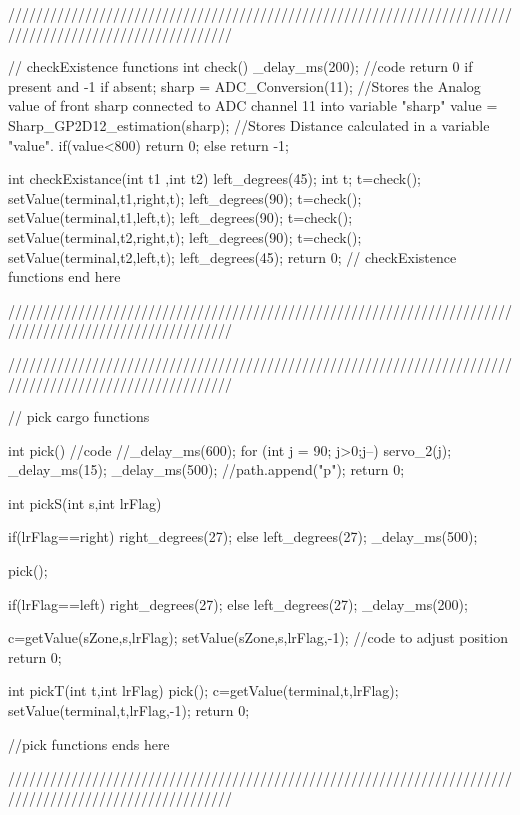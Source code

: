 ////////////////////////////////////////////////////////////////////////////////////////////////////////

// checkExistence functions
int check()
{
    _delay_ms(200);
	//code return 0 if present and -1 if absent;
	sharp = ADC_Conversion(11);						//Stores the Analog value of front sharp connected to ADC channel 11 into variable "sharp"
	value = Sharp_GP2D12_estimation(sharp);            //Stores Distance calculated in a variable "value".
	if(value<800)
		return 0;
	else
		return -1;
}

int checkExistance(int t1 ,int t2)
{
	left_degrees(45);
	int t;
	t=check();
    setValue(terminal,t1,right,t);
    left_degrees(90);
    t=check();
    setValue(terminal,t1,left,t);
    left_degrees(90);
    t=check();
    setValue(terminal,t2,right,t);
    left_degrees(90);
    t=check();
    setValue(terminal,t2,left,t);
    left_degrees(45);
	return 0;
}
// checkExistence functions end here


////////////////////////////////////////////////////////////////////////////////////////////////////////







////////////////////////////////////////////////////////////////////////////////////////////////////////

// pick cargo functions


int pick()
{
    //code
	//_delay_ms(600);
	for (int j = 90; j>0;j--)
	{ servo_2(j);
		_delay_ms(15);
	}
	_delay_ms(500);
	//path.append("p");
    return 0;
}

int pickS(int s,int lrFlag)
{
    if(lrFlag==right)
	    right_degrees(27);
	else
	    left_degrees(27);
 	_delay_ms(500);

    pick();
	
	if(lrFlag==left)
	right_degrees(27);
	else
	left_degrees(27);
	_delay_ms(200);

    c=getValue(sZone,s,lrFlag);
    setValue(sZone,s,lrFlag,-1);
    //code to adjust position
	return 0;
}


int pickT(int t,int lrFlag)
{
    pick();
    c=getValue(terminal,t,lrFlag);
    setValue(terminal,t,lrFlag,-1);
	return 0;
}

//pick functions ends here

////////////////////////////////////////////////////////////////////////////////////////////////////////






